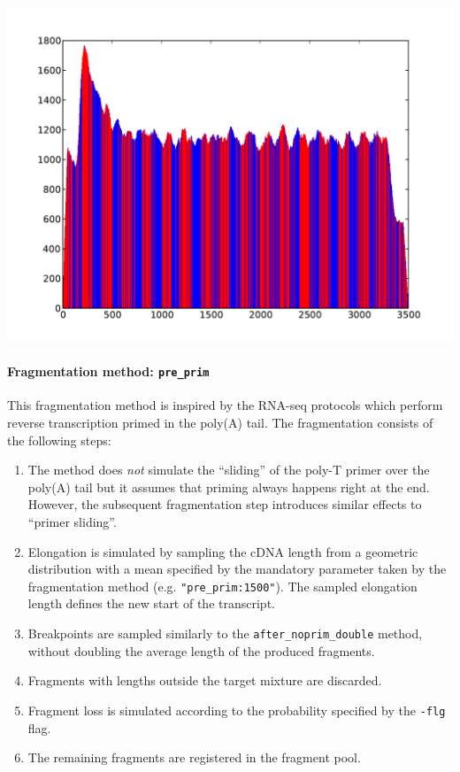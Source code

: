 \begin{center}
\includegraphics[scale=0.6,page=1]{../src/test/cov/cov_after_noprim.pdf}
\end{center}

\paragraph{{Fragmentation method: }\texttt{pre\_prim}}

This fragmentation method is inspired by the RNA-seq protocols which perform reverse transcription primed in the poly(A) tail.
The fragmentation consists of the following steps:

\begin{enumerate}
    \item{The method does \emph{not} simulate the ``sliding'' of the poly-T primer over the poly(A) tail but it assumes that priming always happens right at the end. However, the subsequent fragmentation step introduces similar effects to ``primer sliding''.}
    \item{Elongation is simulated by sampling the cDNA length from a geometric distribution with a mean specified by the mandatory parameter taken by the fragmentation method (e.g. \texttt{"pre\_prim:1500"}). The sampled elongation length defines the new start of the transcript.}
    \item{Breakpoints are sampled similarly to the \texttt{after\_noprim\_double} method, without doubling the average length of the produced fragments.}
    \item{Fragments with lengths outside the target mixture are discarded.}
    \item{Fragment loss is simulated according to the probability specified by the \texttt{-flg} flag.}
    \item{The remaining fragments are registered in the fragment pool.}
\end{enumerate}

